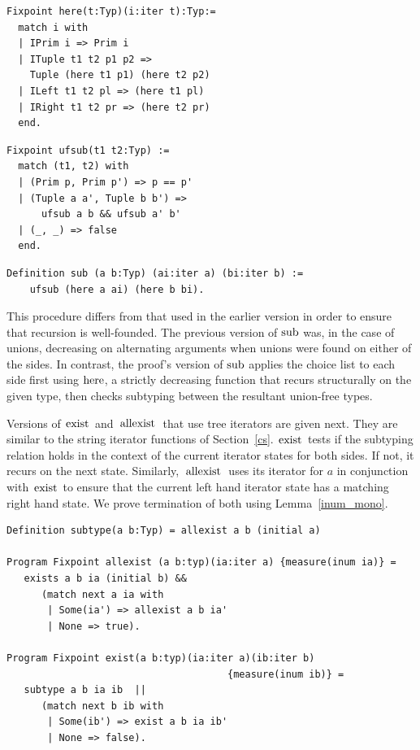 \documentclass[a4paper,english]{lipics-v2019}
\renewcommand{\c}[1]{\ensuremath{\text{\lstinline{#1}}}\xspace}
\begin{document}
\noindent
\begin{minipage}{0.53\textwidth}
\begin{lstlisting}
Fixpoint here(t:Typ)(i:iter t):Typ:=
  match i with
  | IPrim i => Prim i
  | ITuple t1 t2 p1 p2 => 
    Tuple (here t1 p1) (here t2 p2)
  | ILeft t1 t2 pl => (here t1 pl)
  | IRight t1 t2 pr => (here t2 pr)
  end.
\end{lstlisting}
\end{minipage}
\begin{minipage}{0.47\textwidth}
\begin{lstlisting}
Fixpoint ufsub(t1 t2:Typ) :=
  match (t1, t2) with
  | (Prim p, Prim p') => p == p'
  | (Tuple a a', Tuple b b') =>
      ufsub a b && ufsub a' b'
  | (_, _) => false
  end.
\end{lstlisting}
\end{minipage}
\begin{lstlisting}
Definition sub (a b:Typ) (ai:iter a) (bi:iter b) :=
    ufsub (here a ai) (here b bi).
\end{lstlisting}

\noindent This procedure differs from that used in the earlier version in
order to ensure that recursion is well-founded. The previous version of
\c{sub} was, in the case of unions, decreasing on alternating arguments  when
unions were found on either of the sides. In contrast, the proof's version of
\c{sub} applies the choice list to each side first using \c{here}, a strictly
decreasing function that recurs structurally on the given type, then checks
subtyping between the resultant union-free types.

\noindent
Versions of \c{exist} and \c{allexist} that use tree iterators are given
next. They are similar to the string iterator functions of Section~\ref{cs}.
\c{exist} tests if the subtyping relation holds in the context of the
current iterator states for both sides. If not, it recurs on the next
state. Similarly, \c{allexist} uses its iterator for $a$ in conjunction with
\c{exist} to ensure that the current left hand iterator state has a matching
right hand state. We prove termination of both using Lemma~\ref{inum_mono}.

\begin{lstlisting}
Definition subtype(a b:Typ) = allexist a b (initial a)

Program Fixpoint allexist (a b:typ)(ia:iter a) {measure(inum ia)} =
   exists a b ia (initial b) && 
      (match next a ia with 
       | Some(ia') => allexist a b ia' 
       | None => true).

Program Fixpoint exist(a b:typ)(ia:iter a)(ib:iter b)
                                      {measure(inum ib)} =
   subtype a b ia ib  || 
      (match next b ib with 
       | Some(ib') => exist a b ia ib' 
       | None => false).
\end{lstlisting}
\end{document}
